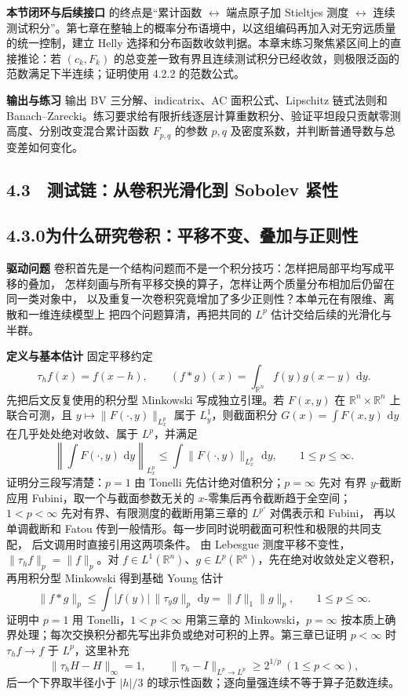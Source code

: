 \documentclass[11pt,a4paper]{ctexart}
\newcommand{\R}{\mathbb R}
\newcommand{\dd}{\,\mathrm d}
\newcommand{\planitem}[1]{\par\smallskip\noindent\textcolor{deepblue}{\textbf{#1}}\quad}
\newcommand{\unithead}[2]{\subsection{#1\quad #2}}
\begin{document}
\planitem{本节闭环与后续接口}
4.2 的终点是“累计函数 $\leftrightarrow$ 端点原子加 Stieltjes 测度 $\leftrightarrow$ 连续测试积分”。第七章在整轴上的概率分布语境中，以这组编码再加入对无穷远质量的统一控制，建立 Helly 选择和分布函数收敛判据。本章末练习聚焦紧区间上的直接推论：若 $(c_k,F_k)$ 的总变差一致有界且连续测试积分已经收敛，则极限泛函的范数满足下半连续；证明使用 4.2.2 的范数公式。

\planitem{输出与练习}
输出 BV 三分解、indicatrix、AC 面积公式、Lipschitz 链式法则和 Banach--Zarecki。练习要求给有限折线逐层计算重数积分、验证平坦段只贡献零测高度、分别改变混合累计函数 $F_{p,q}$ 的参数 $p,q$ 及密度系数，并判断普通导数与总变差如何变化。

\subsection*{4.3　测试链：从卷积光滑化到 Sobolev 紧性}

\unithead{4.3.0}{为什么研究卷积：平移不变、叠加与正则性}

\planitem{驱动问题}
卷积首先是一个结构问题而不是一个积分技巧：怎样把局部平均写成平移的叠加，
怎样刻画与所有平移交换的算子，怎样让两个质量分布相加后仍留在同一类对象中，
以及重复一次卷积究竟增加了多少正则性？本单元在有限维、离散和一维连续模型上
把四个问题算清，再把共同的 $L^p$ 估计交给后续的光滑化与半群。

\planitem{定义与基本估计}
固定平移约定
\[
 \tau_hf(x)=f(x-h),\qquad (f*g)(x)=\int_{\R^n}f(y)g(x-y)\,\dd y.
\]
先把后文反复使用的积分型 Minkowski 写成独立引理。若 $F(x,y)$ 在
$\R^n\times\R^n$ 上联合可测，且
$y\mapsto\|F(\cdot,y)\|_{L^p_x}$ 属于 $L^1_y$，则截面积分
$G(x)=\int F(x,y)\,\dd y$ 在几乎处处绝对收敛、属于 $L^p$，并满足
\[
 \left\|\int F(\cdot,y)\,\dd y\right\|_{L^p_x}
 \le \int\|F(\cdot,y)\|_{L^p_x}\,\dd y,
 \qquad 1\le p\le\infty .
\]
证明分三段写清楚：$p=1$ 由 Tonelli 先估计绝对值积分；$p=\infty$ 先对
有界 $y$-截断应用 Fubini，取一个与截面参数无关的 $x$-零集后再令截断趋于全空间；
$1<p<\infty$ 先对有界、有限测度的截断用第三章的 $L^{p'}$ 对偶表示和 Fubini，
再以单调截断和 Fatou 传到一般情形。每一步同时说明截面可积性和极限的共同支配，
后文调用时直接引用这两项条件。
由 Lebesgue 测度平移不变性，$\|\tau_hf\|_p=\|f\|_p$。对
$f\in L^1(\R^n)$、$g\in L^p(\R^n)$，先在绝对收敛处定义卷积，
再用积分型 Minkowski 得到基础 Young 估计
\[
 \|f*g\|_p\le\int|f(y)|\,\|\tau_y g\|_p\,\dd y
 =\|f\|_1\|g\|_p,\qquad 1\le p\le\infty.
\]
证明中 $p=1$ 用 Tonelli，$1<p<\infty$ 用第三章的 Minkowski，$p=\infty$
按本质上确界处理；每次交换积分都先写出非负或绝对可积的上界。第三章已证明
$p<\infty$ 时 $\tau_hf\to f$ 于 $L^p$，这里补充
\[
 \|\tau_hH-H\|_\infty=1,
 \qquad \|\tau_h-I\|_{L^p\to L^p}\ge2^{1/p}\ (1\le p<\infty),
\]
后一个下界取半径小于 $|h|/3$ 的球示性函数；逐向量强连续不等于算子范数连续。
\end{document}

